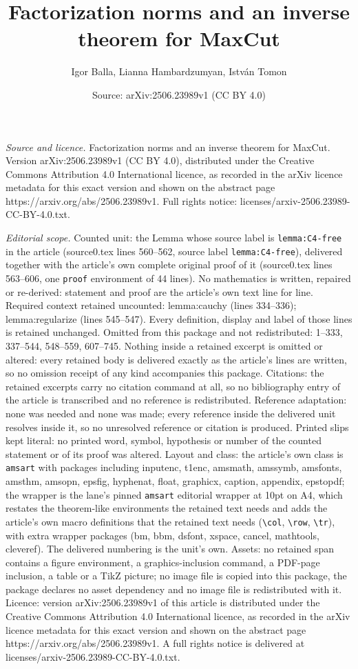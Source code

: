 \documentclass[10pt,a4paper]{amsart}
\title[Factorization norms and an inverse theorem for MaxCut]{Factorization norms and an inverse theorem for MaxCut}
\author{Igor Balla, Lianna Hambardzumyan, Istv\'an Tomon}
\date{Source: arXiv:2506.23989v1 (CC BY 4.0)}
\begin{document}
\maketitle

\noindent\emph{Source and licence.} Factorization norms and an inverse theorem for MaxCut. Version arXiv:2506.23989v1 (CC BY 4.0), distributed under the Creative Commons Attribution 4.0 International licence, as recorded in the arXiv licence metadata for this exact version and shown on the abstract page https://arxiv.org/abs/2506.23989v1. Full rights notice: licenses/arxiv-2506.23989-CC-BY-4.0.txt.\par\smallskip

\noindent\textit{Editorial scope.} Counted unit: the Lemma whose source label is \texttt{lemma:C4-free} in the article (source0.tex lines 560--562, source label \texttt{lemma:C4-free}), delivered together with the article's own complete original proof of it (source0.tex lines 563--606, one \texttt{proof} environment of 44 lines). No mathematics is written, repaired or re-derived: statement and proof are the article's own text line for line. Required context retained uncounted: lemma:cauchy (lines 334--336); lemma:regularize (lines 545--547). Every definition, display and label of those lines is retained unchanged. Omitted from this package and not redistributed: 1--333, 337--544, 548--559, 607--745. Nothing inside a retained excerpt is omitted or altered: every retained body is delivered exactly as the article's lines are written, so no omission receipt of any kind accompanies this package. Citations: the retained excerpts carry no citation command at all, so no bibliography entry of the article is transcribed and no reference is redistributed. Reference adaptation: none was needed and none was made; every reference inside the delivered unit resolves inside it, so no unresolved reference or citation is produced. Printed slips kept literal: no printed word, symbol, hypothesis or number of the counted statement or of its proof was altered. Layout and class: the article's own class is \texttt{amsart} with packages including inputenc, t1enc, amsmath, amssymb, amsfonts, amsthm, amsopn, epsfig, hyphenat, float, graphicx, caption, appendix, epstopdf; the wrapper is the lane's pinned \texttt{amsart} editorial wrapper at 10pt on A4, which restates the theorem-like environments the retained text needs and adds the article's own macro definitions that the retained text needs (\texttt{\textbackslash col}, \texttt{\textbackslash row}, \texttt{\textbackslash tr}), with extra wrapper packages (bm, bbm, dsfont, xspace, cancel, mathtools, cleveref). The delivered numbering is the unit's own. Assets: no retained span contains a figure environment, a graphics-inclusion command, a PDF-page inclusion, a table or a TikZ picture; no image file is copied into this package, the package declares no asset dependency and no image file is redistributed with it. Licence: version arXiv:2506.23989v1 of this article is distributed under the Creative Commons Attribution 4.0 International licence, as recorded in the arXiv licence metadata for this exact version and shown on the abstract page https://arxiv.org/abs/2506.23989v1. A full rights notice is delivered at licenses/arxiv-2506.23989-CC-BY-4.0.txt. 
\end{document}
